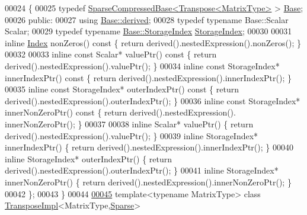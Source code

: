 \begin{DoxyCode}
00024   \{
00025     \textcolor{keyword}{typedef} \hyperlink{group___sparse_core___module_class_eigen_1_1_sparse_compressed_base}{SparseCompressedBase<Transpose<MatrixType>} > 
      \hyperlink{group___sparse_core___module}{Base};
00026   \textcolor{keyword}{public}:
00027     \textcolor{keyword}{using} \hyperlink{group___core___module_a324b16961a11d2ecfd2d1b7dd7946545}{Base::derived};
00028     \textcolor{keyword}{typedef} \textcolor{keyword}{typename} Base::Scalar Scalar;
00029     \textcolor{keyword}{typedef} \textcolor{keyword}{typename} \hyperlink{group___sparse_core___module_a0b540ba724726ebe953f8c0df06081ed}{Base::StorageIndex} \hyperlink{group___sparse_core___module_a0b540ba724726ebe953f8c0df06081ed}{StorageIndex};
00030 
00031     \textcolor{keyword}{inline} \hyperlink{group___core___module_a554f30542cc2316add4b1ea0a492ff02}{Index} nonZeros()\textcolor{keyword}{ const }\{ \textcolor{keywordflow}{return} derived().nestedExpression().nonZeros(); \}
00032     
00033     \textcolor{keyword}{inline} \textcolor{keyword}{const} Scalar* valuePtr()\textcolor{keyword}{ const }\{ \textcolor{keywordflow}{return} derived().nestedExpression().valuePtr(); \}
00034     \textcolor{keyword}{inline} \textcolor{keyword}{const} StorageIndex* innerIndexPtr()\textcolor{keyword}{ const }\{ \textcolor{keywordflow}{return} derived().nestedExpression().innerIndexPtr();
       \}
00035     \textcolor{keyword}{inline} \textcolor{keyword}{const} StorageIndex* outerIndexPtr()\textcolor{keyword}{ const }\{ \textcolor{keywordflow}{return} derived().nestedExpression().outerIndexPtr();
       \}
00036     \textcolor{keyword}{inline} \textcolor{keyword}{const} StorageIndex* innerNonZeroPtr()\textcolor{keyword}{ const }\{ \textcolor{keywordflow}{return} derived().nestedExpression().
      innerNonZeroPtr(); \}
00037 
00038     \textcolor{keyword}{inline} Scalar* valuePtr() \{ \textcolor{keywordflow}{return} derived().nestedExpression().valuePtr(); \}
00039     \textcolor{keyword}{inline} StorageIndex* innerIndexPtr() \{ \textcolor{keywordflow}{return} derived().nestedExpression().innerIndexPtr(); \}
00040     \textcolor{keyword}{inline} StorageIndex* outerIndexPtr() \{ \textcolor{keywordflow}{return} derived().nestedExpression().outerIndexPtr(); \}
00041     \textcolor{keyword}{inline} StorageIndex* innerNonZeroPtr() \{ \textcolor{keywordflow}{return} derived().nestedExpression().innerNonZeroPtr(); \}
00042   \};
00043 \}
00044   
\hyperlink{class_eigen_1_1_transpose_impl_3_01_matrix_type_00_01_sparse_01_4}{00045} \textcolor{keyword}{template}<\textcolor{keyword}{typename} MatrixType> \textcolor{keyword}{class }\hyperlink{class_eigen_1_1_transpose_impl}{TransposeImpl}<MatrixType,\hyperlink{struct_eigen_1_1_sparse}{Sparse}>

\end{DoxyCode}
